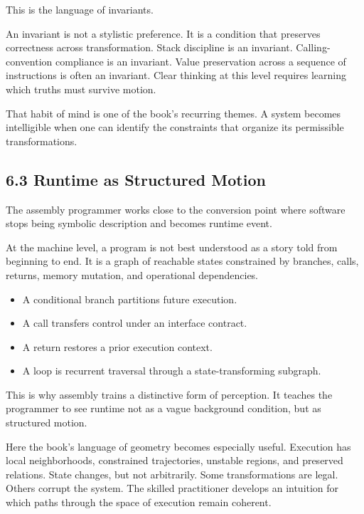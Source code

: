 This is the language of invariants.

An invariant is not a stylistic preference. It is a condition that
preserves correctness across transformation. Stack discipline is an
invariant. Calling-convention compliance is an invariant. Value
preservation across a sequence of instructions is often an invariant.
Clear thinking at this level requires learning which truths must survive
motion.

That habit of mind is one of the book's recurring themes. A system
becomes intelligible when one can identify the constraints that organize
its permissible transformations.

\hypertarget{runtime-as-structured-motion}{%
\subsection{6.3 Runtime as Structured
Motion}\label{runtime-as-structured-motion}}

The assembly programmer works close to the conversion point where
software stops being symbolic description and becomes runtime event.

At the machine level, a program is not best understood as a story told
from beginning to end. It is a graph of reachable states constrained by
branches, calls, returns, memory mutation, and operational dependencies.

\begin{itemize}
\tightlist
\item
  A conditional branch partitions future execution.
\item
  A call transfers control under an interface contract.
\item
  A return restores a prior execution context.
\item
  A loop is recurrent traversal through a state-transforming subgraph.
\end{itemize}

This is why assembly trains a distinctive form of perception. It teaches
the programmer to see runtime not as a vague background condition, but
as structured motion.

Here the book's language of geometry becomes especially useful.
Execution has local neighborhoods, constrained trajectories, unstable
regions, and preserved relations. State changes, but not arbitrarily.
Some transformations are legal. Others corrupt the system. The skilled
practitioner develops an intuition for which paths through the space of
execution remain coherent.

